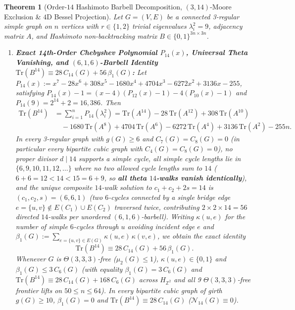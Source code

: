 \documentclass[10pt,a4paper]{article}
\newtheorem{theorem}{Theorem}[section]
\theoremstyle{definition}
\theoremstyle{remark}
\begin{document}
\begin{theorem}[Order-$14$ Hashimoto Barbell Decomposition, $(3,14)$-Moore Exclusion \& $4$D Bessel Projection]\label{thm:b14_bessel}
Let $G = (V, E)$ be a connected 3-regular simple graph on $n$ vertices with $r \in \{1, 2\}$ trivial eigenvalues $\lambda_i^2 = 9$, adjacency matrix $A$, and Hashimoto non-backtracking matrix $B \in \{0,1\}^{3n \times 3n}$.
\begin{enumerate}[label=(\alph*),nosep]
  \item \textbf{Exact 14th-Order Chebyshev Polynomial $P_{14}(x)$, Universal Theta Vanishing, and $(6,1,6)$-Barbell Identity $\mathrm{Tr}(B^{14}) \equiv 28\,C_{14}(G) + 56\,\beta_1(G)$:}
  Let $P_{14}(x) := x^7 - 28x^6 + 308x^5 - 1680x^4 + 4704x^3 - 6272x^2 + 3136x - 255$, satisfying $P_{14}(x) - 1 = (x - 4)(P_{12}(x) - 1) - 4(P_{10}(x) - 1)$ and $P_{14}(9) = 2^{14} + 2 = 16{,}386$. Then
  \begin{equation}\label{eq:trb14}
  \begin{aligned}
    \mathrm{Tr}(B^{14}) &= \sum_{i=1}^n P_{14}(\lambda_i^2) = \mathrm{Tr}(A^{14}) - 28\,\mathrm{Tr}(A^{12}) + 308\,\mathrm{Tr}(A^{10}) \\
    &\quad - 1680\,\mathrm{Tr}(A^8) + 4704\,\mathrm{Tr}(A^6) - 6272\,\mathrm{Tr}(A^4) + 3136\,\mathrm{Tr}(A^2) - 255n.
  \end{aligned}
  \end{equation}
  In every 3-regular graph with $g(G) \ge 6$ and $C_7(G) = C_8(G) = 0$ (in particular every bipartite cubic graph with $C_4(G) = C_8(G) = 0$), no proper divisor $d \mid 14$ supports a simple cycle, all simple cycle lengths lie in $\{6, 9, 10, 11, 12, \dots\}$ where no two allowed cycle lengths sum to $14$ ($6 + 6 = 12 < 14 < 15 = 6 + 9$, so \textbf{all theta $14$-walks vanish identically}), and the unique composite $14$-walk solution to $c_1 + c_2 + 2s = 14$ is $(c_1, c_2, s) = (6, 6, 1)$ (two $6$-cycles connected by a single bridge edge $e = \{u, v\} \notin E(C_1) \cup E(C_2)$ traversed twice, contributing $2 \times 2 \times 14 = 56$ directed $14$-walks per unordered $(6,1,6)$-barbell). Writing $\kappa(u, e)$ for the number of simple $6$-cycles through $u$ avoiding incident edge $e$ and $\beta_1(G) := \sum_{e=\{u,v\} \in E(G)} \kappa(u, e)\,\kappa(v, e)$, we obtain the exact identity
  \begin{equation}\label{eq:trb14_topo}
    \mathrm{Tr}(B^{14}) \equiv 28\,C_{14}(G) + 56\,\beta_1(G).
  \end{equation}
  Whenever $G$ is $\Theta(3,3,3)$-free ($\mu_2(G) \le 1$), $\kappa(u, e) \in \{0, 1\}$ and $\beta_1(G) \le 3\,C_6(G)$ (with equality $\beta_1(G) = 3\,C_6(G)$ and $\mathrm{Tr}(B^{14}) \equiv 28\,C_{14}(G) + 168\,C_6(G)$ across $H_{\mathbb{Z}^2}$ and all 9 $\Theta(3,3,3)$-free frontier lifts on $50 \le n \le 64$). In every bipartite cubic graph of girth $g(G) \ge 10$, $\beta_1(G) = 0$ and $\mathrm{Tr}(B^{14}) \equiv 28\,C_{14}(G)$ ($\mathcal{N}_{14}(G) \equiv 0$).

\end{enumerate}
\end{theorem}
\end{document}
